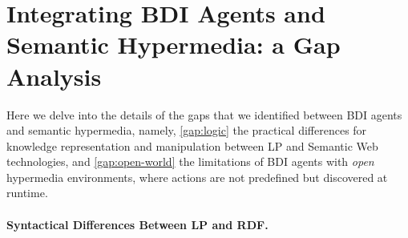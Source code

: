\section{Integrating \acs{BDI} Agents and Semantic Hypermedia: a Gap Analysis}
\label{sec:gap-analysis}


Here we delve into the details of the gaps that we identified between \ac{BDI} agents and semantic hypermedia,
namely,
\ref{gap:logic} the practical differences for knowledge representation and manipulation
between \ac{LP} and Semantic Web technologies,
and
\ref{gap:open-world} the limitations of \ac{BDI} agents with \emph{open} hypermedia environments,
where actions are not predefined but discovered at runtime.

\paragraph{Syntactical Differences Between \acs{LP} and \acs{RDF}.}

